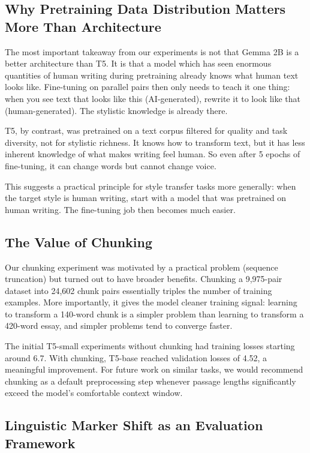 \documentclass{article}
\begin{document}
\subsection{Why Pretraining Data Distribution Matters More Than Architecture}

The most important takeaway from our experiments is not that Gemma 2B is a better architecture than T5. It is that a model which has seen enormous quantities of human writing during pretraining already knows what human text looks like. Fine-tuning on parallel pairs then only needs to teach it one thing: when you see text that looks like this (AI-generated), rewrite it to look like that (human-generated). The stylistic knowledge is already there.

T5, by contrast, was pretrained on a text corpus filtered for quality and task diversity, not for stylistic richness. It knows how to transform text, but it has less inherent knowledge of what makes writing feel human. So even after 5 epochs of fine-tuning, it can change words but cannot change voice.

This suggests a practical principle for style transfer tasks more generally: when the target style is human writing, start with a model that was pretrained on human writing. The fine-tuning job then becomes much easier.

\subsection{The Value of Chunking}

Our chunking experiment was motivated by a practical problem (sequence truncation) but turned out to have broader benefits. Chunking a 9,975-pair dataset into 24,602 chunk pairs essentially triples the number of training examples. More importantly, it gives the model cleaner training signal: learning to transform a 140-word chunk is a simpler problem than learning to transform a 420-word essay, and simpler problems tend to converge faster.

The initial T5-small experiments without chunking had training losses starting around 6.7. With chunking, T5-base reached validation losses of 4.52, a meaningful improvement. For future work on similar tasks, we would recommend chunking as a default preprocessing step whenever passage lengths significantly exceed the model's comfortable context window.

\subsection{Linguistic Marker Shift as an Evaluation Framework}
\end{document}
